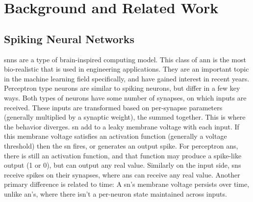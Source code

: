 %
%


\chapter{Background and Related Work}\label{chapter:background}
    \section{Spiking Neural Networks}
    \glspl{snn} are a type of brain-inspired computing model. This class of
    \gls{ann} is the most bio-realistic that is used in engineering
    applications. They are an important topic in the machine learning field
    specifically, and have gained interest in recent years. Perceptron type
    neurons are similar to spiking neurons, but differ in a few key ways. Both
    types of neurons have some number of synapses, on which inputs are
    received. These inputs are transformed based on per-synapse parameters
    (generally multiplied by a synaptic weight), the summed together. This is
    where the behavior diverges. \Gls{sn} add to a leaky membrane voltage with
    each input. If this membrane voltage satisfies an activation function
    (generally a voltage threshold) then the \gls{sn} fires, or generates an
    output spike. For perceptron \glspl{an}, there is still an activation
    function, and that function may produce a spike-like output (1 or 0), but
    can output any real value. Similarly on the input side, \glspl{sn} receive
    spikes on their synapses, where \glspl{an} can receive any real
    value. Another primary difference is related to time: A \gls{sn}'s membrane
    voltage persists over time, unlike \gls{an}'s, where there isn't a
    per-neuron state maintained across inputs.
    
